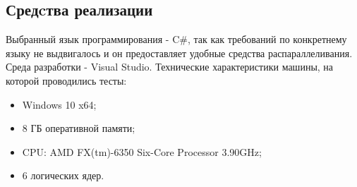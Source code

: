 \documentclass{article}
\begin{document}
	\subsection{Средcтва реализации}
	Выбранный язык программирования - C\#, так как требований по конкретнему языку не выдвигалось и он предоставляет удобные средства распараллеливания.\cite{c-parallel} Среда разработки - Visual Studio.\cite{vs}
\newline
	\indent Технические характеристики машины, на которой проводились тесты:
	\begin{itemize}
	\item Windows 10 x64;
	\item 8 ГБ оперативной памяти;
	\item CPU: AMD FX(tm)-6350 Six-Core Processor 3.90GHz;
	\item 6 логических ядер.
	\end{itemize}	
\end{document}
